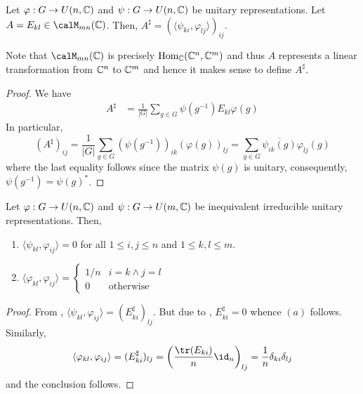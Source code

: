 \begin{lemma}
    Let $\varphi: G\to U(n,\mathbb{C})$ and $\psi: G\to U(n,\mathbb{C})$ be unitary representations. Let $A = E_{kl}\in\calM_{mn}(\bbC)$. Then, $A^\sharp = (\langle\psi_{ki}, \varphi_{lj}\rangle)_{ij}$.
\end{lemma}
Note that $\calM_{mn}(\bbC)$ is precisely $\operatorname{Hom}_{\mathbb{C}}(\mathbb{C}^n,\mathbb{C}^m)$ and thus $A$ represents a linear transformation from $\mathbb{C}^n$ to $\mathbb{C}^m$ and hence it makes sense to define $A^\sharp$.
\begin{proof}
    We have 
    \begin{align*}
        A^\sharp &= \frac{1}{|G|}\sum_{g\in G}\psi(g^{-1})E_{kl}\varphi(g)
    \end{align*}
    In particular, 
    \begin{equation*}
        (A^\sharp)_{ij} = \frac{1}{|G|}\sum_{g\in G}(\psi(g^{-1}))_{ik}(\varphi(g))_{lj} = \sum_{g\in G}\overline{\psi_{ik}(g)}\varphi_{lj}(g)
    \end{equation*}
    where the last equality follows since the matrix $\psi(g)$ is unitary, consequently, $\psi(g^{-1}) = \psi(g)^*$.
\end{proof}

\begin{theorem}
    Let $\varphi: G\to U(n,\mathbb{C})$ and $\psi: G\to U(m,\mathbb{C})$ be inequivalent irreducible unitary representations. Then, 
    \begin{enumerate}[label=(\alph*)]
        \item $\langle\psi_{kl},\varphi_{ij}\rangle = 0$ for all $1\le i,j\le n$ and $1\le k,l\le m$.
        \item 
        $\displaystyle
            \langle\varphi_{kl},\varphi_{ij}\rangle = 
            \begin{cases}
                1/n & i = k\wedge j = l\\
                0 & \text{otherwise}
            \end{cases}
        $
    \end{enumerate}
\end{theorem}
\begin{proof}
    From , $\langle\psi_{kl},\varphi_{ij}\rangle = (E_{ki}^\sharp)_{lj}$. But due to , $E_{ki}^\sharp = 0$ whence $(a)$ follows. Similarly, 
    \begin{equation*}
        \langle\varphi_{kl},\varphi_{ij}\rangle = (E_{ki}^\sharp)_{lj} = \left(\frac{\tr(E_{ki})}{n}\id_{n}\right)_{lj} = \frac{1}{n}\delta_{ki}\delta_{lj}
    \end{equation*}
    and the conclusion follows.
\end{proof}

